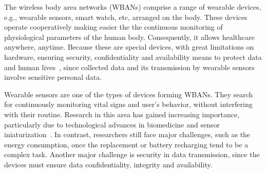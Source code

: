 
The wireless body area networks (WBANs) comprise a range of wearable devices, e.g., wearable sensors, smart watch, etc, arranged on the body. These devices operate cooperatively making easier the the continuous monitoring of physiological parameters of the human body. Consequently, it allows healthcare anywhere, anytime. Because these are special devices, with great limitations on hardware, ensuring security, confidentiality and availability means to protect data and human lives~\cite{ali2013energy}, since collected data and its transmission by wearable sensors involve sensitive personal data.


Wearable sensors are one of the types of devices forming WBANs. %
They search for continuously monitoring vital signs and user's  behavior, without interfering with their routine. Research in this area has gained increasing importance, particularly due to technological advances in biomedicine and sensor iniaturization~\cite{bandodkar2014non}. In contrast, researchers still face major challenges, such as the energy consumption, once the replacement or battery recharging tend to be a complex task. Another major challenge is security in data transmission, since the devices must ensure data confidentiality, integrity and availability.


